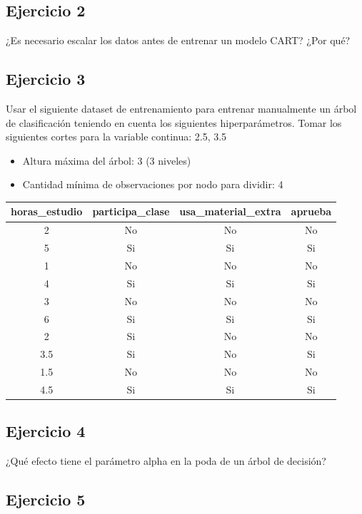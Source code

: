 \documentclass[12pt]{article}
\begin{document}
\subsection{Ejercicio 2}

¿Es necesario escalar los datos antes de entrenar un modelo CART? ¿Por qué?

\subsection{Ejercicio 3}

Usar el siguiente dataset de entrenamiento para entrenar manualmente un árbol de clasificación teniendo en cuenta los siguientes hiperparámetros. Tomar los siguientes cortes para la variable continua: 2.5, 3.5
    \begin{itemize}
      \item Altura máxima del árbol: 3 (3 niveles)
      \item Cantidad mínima de observaciones por nodo para dividir: 4
    \end{itemize}
    
    \begin{center}
    \begin{tabular}{cccc}
    \toprule
    horas\_estudio & participa\_clase & usa\_material\_extra & aprueba \\
    \midrule
    2 & No & No & No \\
    5 & Si & Si & Si \\
    1 & No & No & No \\
    4 & Si & Si & Si \\
    3 & No & No & No \\
    6 & Si & Si & Si \\
    2 & Si & No & No \\
    3.5 & Si & No & Si \\
    1.5 & No & No & No \\
    4.5 & Si & Si & Si \\
    \bottomrule
    \end{tabular}
    \end{center}

\subsection{Ejercicio 4}

¿Qué efecto tiene el parámetro alpha en la poda de un árbol de decisión?

\subsection{Ejercicio 5}
\end{document}
